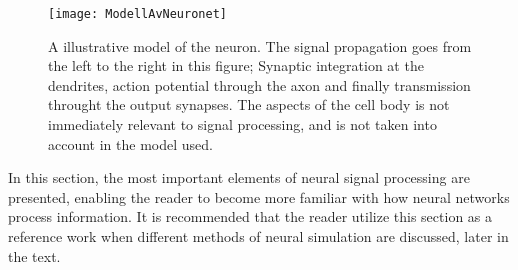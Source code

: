 \begin{figure}[hbt!p]
	\centering
	\texttt{[image: ModellAvNeuronet]}
	\caption{A illustrative model of the neuron. The signal propagation goes from the left to the right in this figure;
			Synaptic integration at the dendrites, action potential through the axon and finally transmission throught the output synapses. 
			The aspects of the cell body is not immediately relevant to signal processing, and is not taken into account in the model used. }
	\label{figFigurAvNeuronet}
\end{figure}
	
	In this section, the most important elements of neural signal processing are presented, enabling the reader to become more familiar with how neural networks process information.
	It is recommended that the reader utilize this section as a reference work when different methods of neural simulation are discussed, later in the text. %




	



	





		
	
